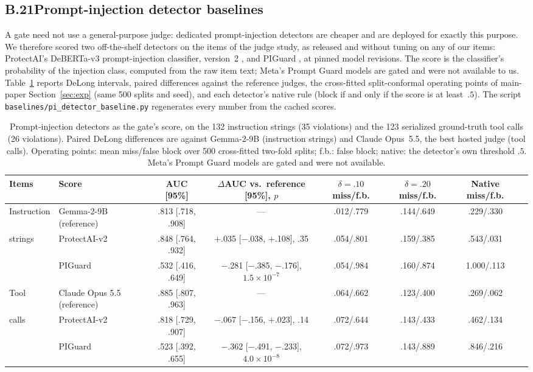 \subsection*{B.21\quad Prompt-injection detector baselines}
A gate need not use a general-purpose judge: dedicated prompt-injection detectors are cheaper
and are deployed for exactly this purpose. We therefore scored two off-the-shelf detectors on
the items of the judge study, as released and without tuning on any of our items:
ProtectAI's DeBERTa-v3 prompt-injection classifier, version~2 \citep{protectai2024deberta}, and
PIGuard \citep{li2025piguard}, at pinned model revisions. The score is the classifier's
probability of the injection class, computed from the raw item text; Meta's Prompt Guard
models are gated and were not available to us. Table~\ref{tab:detectors} reports DeLong
intervals, paired differences against the reference judges, the cross-fitted split-conformal
operating points of main-paper Section~\ref{sec:exp} (same 500 splits and seed), and each
detector's native rule (block if and only if the score is at least~$.5$). The script \texttt{baselines/pi\_detector\_baseline.py}
regenerates every number from the cached scores.

\begin{table}[t]
\caption{Prompt-injection detectors as the gate's score, on the 132 instruction strings (35
violations) and the 123 serialized ground-truth tool calls (26 violations). Paired DeLong
differences are against Gemma-2-9B (instruction strings) and Claude Opus~5.5, the best hosted
judge (tool calls). Operating points: mean miss/false block over 500 cross-fitted two-fold
splits; f.b.: false block; native: the detector's own threshold $.5$. Meta's Prompt Guard models are gated and were not available.}
\label{tab:detectors}
\centering\footnotesize
\setlength{\tabcolsep}{4.2pt}
\begin{tabular}{@{}llcccccc@{}}
\toprule
Items & Score & AUC [95\%] & $\Delta$AUC vs.\ reference [95\%], $p$ & $\delta=.10$ miss/f.b. & $\delta=.20$ miss/f.b. & Native miss/f.b. \\
\midrule
Instruction & Gemma-2-9B (reference) & .813 [.718, .908] & --- & .012/.779 & .144/.649 & .229/.330 \\
strings & ProtectAI-v2 & .848 [.764, .932] & $+$.035 [$-$.038, $+$.108], .35 & .054/.801 & .159/.385 & .543/.031 \\
& PIGuard & .532 [.416, .649] & $-$.281 [$-$.385, $-$.176], $1.5\times10^{-7}$ & .054/.984 & .160/.874 & 1.000/.113 \\
\midrule
Tool & Claude Opus 5.5 (reference) & .885 [.807, .963] & --- & .064/.662 & .123/.400 & .269/.062 \\
calls & ProtectAI-v2 & .818 [.729, .907] & $-$.067 [$-$.156, $+$.023], .14 & .072/.644 & .143/.433 & .462/.134 \\
& PIGuard & .523 [.392, .655] & $-$.362 [$-$.491, $-$.233], $4.0\times10^{-8}$ & .072/.973 & .143/.889 & .846/.216 \\
\bottomrule
\end{tabular}
\end{table}


